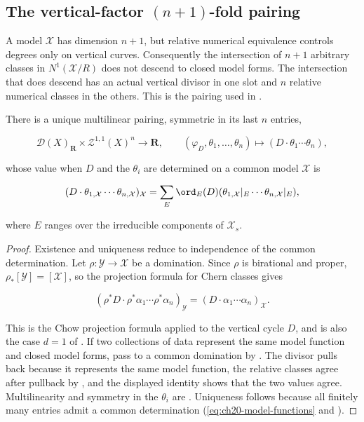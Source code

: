 \subsection{The vertical-factor \texorpdfstring{$(n+1)$}{(n+1)}-fold pairing}
\label{sec:ch20-pairing}

A model $\mathcal X$ has dimension $n+1$, but relative numerical
equivalence controls degrees only on vertical curves.  Consequently the
intersection of $n+1$ arbitrary classes in $N^1(\mathcal X/R)$ does not
descend to closed model forms.  The intersection that does descend has an
actual vertical divisor in one slot and $n$ relative numerical classes in
the others.  This is the pairing used in \cite[\S2.7]{BFJ15}.

\begin{proposition}
\label{prop:ch20-intersection-pairing}
There is a unique multilinear pairing, symmetric in its last $n$ entries,

\begin{equation}
\label{eq:ch20-intersection-pairing}
 \mathcal D(X)_{\mathbf R}\times\mathcal Z^{1,1}(X)^n
 \longrightarrow\mathbf R,
 \qquad
 (\varphi_D,\theta_1,\ldots,\theta_n)\longmapsto
 (D\cdot\theta_1\cdots\theta_n),
\end{equation}

whose value when $D$ and the $\theta_i$ are determined on a common model
$\mathcal X$ is

\[
 (D\cdot\theta_{1,\mathcal X}\cdots\theta_{n,\mathcal X})_{\mathcal X}
 =\sum_E\ord_E(D)
   (\theta_{1,\mathcal X}|_E\cdots\theta_{n,\mathcal X}|_E),
\]

where $E$ ranges over the irreducible components of $\mathcal X_s$.
\end{proposition}

\begin{proof}
Existence and uniqueness reduce to independence of the common determination.
Let $\rho:\mathcal Y\to\mathcal X$ be a domination.  Since $\rho$ is
birational and proper, $\rho_*[\mathcal Y]=[\mathcal X]$, so the
projection formula for Chern classes gives

\[
 (\rho^*D\cdot\rho^*\alpha_1\cdots\rho^*\alpha_n)_{\mathcal Y}
 =(D\cdot\alpha_1\cdots\alpha_n)_{\mathcal X}.
\]

This is the Chow projection formula  applied to
the vertical cycle $D$, and is also the case $d=1$ of
.  If two collections of data represent
the same model function and closed model forms, pass to a common domination
by .  The divisor pulls back because it
represents the same model function, the relative classes agree after
pullback by , and the displayed identity
shows that the two values agree.  Multilinearity and symmetry in the
$\theta_i$ are .  Uniqueness follows because
all finitely many entries admit a common determination
(\eqref{eq:ch20-model-functions} and
).
\end{proof}


